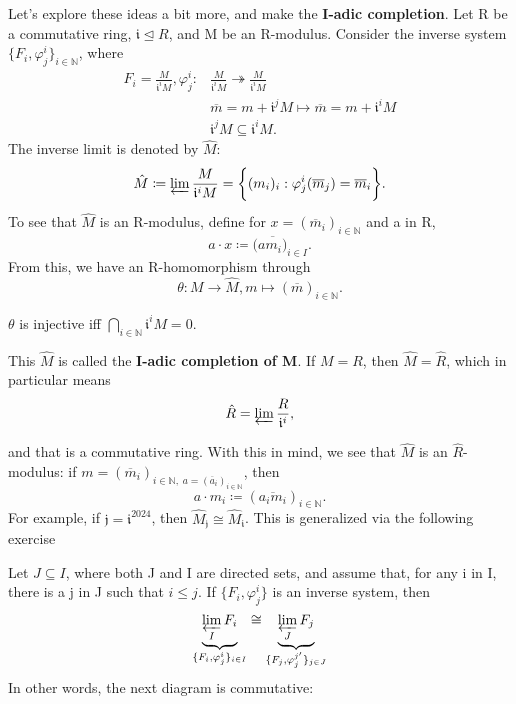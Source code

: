 \documentclass[../category_theory.tex]{subfiles}
\begin{document}
\begin{example}
	Let's explore these ideas a bit more, and make the \textbf{I-adic completion}. Let R be a commutative ring, \(\mathfrak{i} \trianglelefteq R \), and M be an R-modulus. Consider the inverse system \(\{F_{i}, \varphi_{j}^{i}\}_{i\in \mathbb{N}}\), where
	\begin{align*}
		F_{i}= \frac{M}{\mathfrak{i}^{i}M}, \varphi_{j}^{i}: & \frac{M}{\mathfrak{i}^{i}M}\twoheadrightarrow \frac{M}{\mathfrak{i}^{i}M} \\
		                                                     & \overline{m}=m+\mathfrak{i}^{j}M\mapsto \overline{m}=m+\mathfrak{i}^{i}M  \\
		                                                     & \mathfrak{i}^{j}M\subseteq \mathfrak{i}^{i}M.
	\end{align*}
	The inverse limit is denoted by \(\hat{M}\):
	\[
		\hat{M}\coloneqq \varprojlim_{}\frac{M}{\mathfrak{i}^{i}M}=\biggl\{(m_{i})_{i}: \varphi_{j}^{i}(\overline{m}_{j})=\overline{m}_{i}\biggr\}.
	\]
	To see that \(\hat{M}\) is an R-modulus, define for \(x=(\overline{m}_{i})_{i\in \mathbb{N}}\) and a in R,
	\[
		a \cdot x\coloneqq (\overline{am_{i})}_{i\in I}.
	\]
	From this, we have an R-homomorphism through
	\[
		\theta:M\rightarrow \hat{M}, m\mapsto (\overline{m})_{i\in \mathbb{N}}.
	\]
	\begin{exr}
		\(\theta \) is injective iff \(\bigcap_{i\in \mathbb{N}}^{}\mathfrak{i}^{i}M = 0\).
	\end{exr}
	This \(\hat{M}\) is called the \textbf{I-adic completion of M}. If \(M=R\), then \(\hat{M}=\hat{R}\), which in particular means
	\[
		\hat{R}=\varprojlim_{}\frac{R}{\mathfrak{i}^{i}},
	\]
	and that is a commutative ring. With this in mind, we see that \(\hat{M}\) is an \(\hat{R}\)-modulus: if \(m=(\overline{m}_{i})_{i\in \mathbb{N},\; a=(\overline{a}_{i})_{i\in \mathbb{N}}}\), then
	\[
		a \cdot m_{i}\coloneqq (\overline{a_{i}m_{i}})_{i\in \mathbb{N}}.
	\]
	For example, if \(\mathfrak{j}=\mathfrak{i}^{2024}\), then \(\hat{M}_{\mathfrak{j}}\cong \hat{M}_{\mathfrak{i}}\). This is generalized via the following exercise
	\begin{exr}
		Let \(J\subseteq I\), where both J and I are directed sets, and assume that, for any i in I, there is a j in J such that \(i\leq j\). If \(\{F_{i}, \varphi_{j}^{i}\}\) is an inverse system, then
		\[
			\underbrace{\varprojlim_{I}F_{i}}_{\{F_{i}, \varphi_{j}^{i}\}_{i\in I}}\cong \underbrace{\varprojlim_{J}F_{j}}_{\{F_{j}, \varphi_{j}^{j'}\}_{j\in J}}
		\]
		In other words, the next diagram is commutative:
		\begin{center}

\end{center}
\end{exr}
\end{example}
\end{document}
